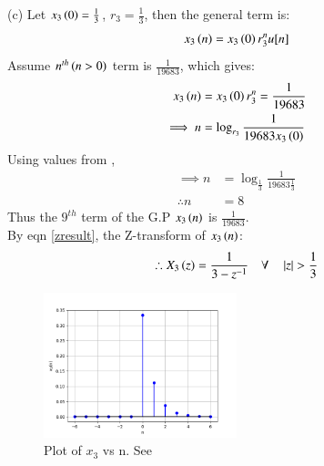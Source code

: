 \documentclass[journal,12pt,twocolumn]{IEEEtran}
\theoremstyle{remark}
\begin{document}
(c) Let $x_3\left(0\right) = \frac{1}{3}$, $r_3 = \frac{1}{3}$, then the general term is:
\begin{align}
    x_3\left(n\right) = x_3\left(0\right) r_3^nu[n]
\end{align}
Assume $n^{th}\left(n > 0\right)$ term is $\frac{1}{19683}$, which gives: 
\begin{align}
    x_3\left(n\right) &= x_3\left(0\right) r_3^n = \frac{1}{19683}\\
    \implies n &= \log_{r_3}{\frac{1}{19683 x_3\left(0\right)}}
\end{align}
Using values from ,
\begin{align}
    \implies n &= \log_{\frac{1}{3}}{\frac{1}{19683 \frac{1}{3}}}\\
    \therefore n &= 8
\end{align}
Thus the $9^{th}$ term of the G.P $x_3\left(n\right)$ is $\frac{1}{19683}$.\\
By eqn \ref{zresult}, the Z-transform of $x_3\left(n\right)$:
\begin{align}
    \therefore X_3\left(z\right) = \frac{1}{3 - z^{-1}} \quad \forall \quad \left\vert z\right\vert > \frac{1}{3}
\end{align}

\begin{figure}[h!]
    \renewcommand\thefigure{3}
    \centering
    \includegraphics[width=0.5\textwidth]{figs/c.png}
    \caption[short]{Plot of $x_3$ vs n. See }
    \label{fig:img3}
\end{figure}


\end{document}
